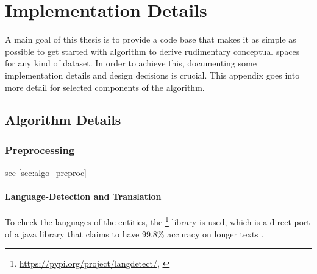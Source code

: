 




\chapter{Implementation Details} %

A main goal of this thesis is to provide a code base that makes it as simple as possible to get started with  algorithm to derive rudimentary conceptual spaces for any kind of dataset. In order to achieve this, documenting some implementation details and design decisions is crucial.
This appendix goes into more detail for selected components of the algorithm.

\label{AppendixB} 

\section{Algorithm Details}

\subsection*{Preprocessing}

see \autoref{sec:algo_preproc}

\subsubsection*{Language-Detection and Translation}
\label{ap:translating}

To check the languages of the entities, the \footnote{\url{https://pypi.org/project/langdetect/}, \textcite{nakatani2010langdetect}} library is used, which is a direct port of a java library that claims to have 99.8\% accuracy on longer texts \cite{nakatani2010langdetect}. 
\newline


